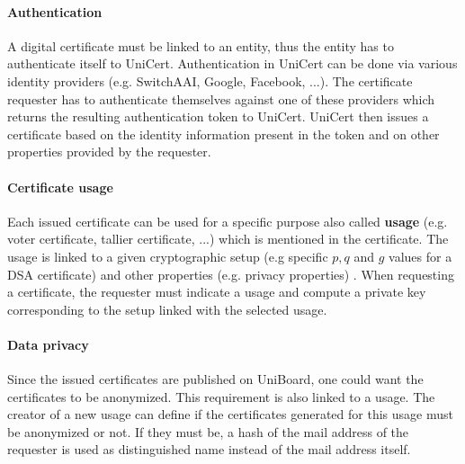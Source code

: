 \documentclass[bibtotoc,halfparskip,oneside]{scrreprt}
\begin{document}
\paragraph*{Authentication} A digital certificate must be linked to an entity, thus the entity has to authenticate itself to UniCert. Authentication in UniCert can be done via various identity providers (e.g. SwitchAAI, Google, Facebook, ...). The certificate requester has to authenticate themselves against one of these providers which returns the resulting authentication token to UniCert. 
UniCert then issues a certificate based on the identity information present in the token and on other properties provided by the requester.


\paragraph*{Certificate usage} Each issued certificate can be used for a specific purpose also called \textbf{usage} (e.g. voter certificate, tallier certificate, ...) which is mentioned in the certificate. The usage is linked to a given cryptographic setup (e.g specific $p,q$ and $g$ values for a DSA certificate) and other properties (e.g. privacy properties) . When requesting a certificate, the requester must indicate a usage and compute a private key corresponding to the setup linked with the selected usage. 

\paragraph*{Data privacy} Since the issued certificates are published on UniBoard, one could want the certificates to be anonymized. This requirement is also linked to a usage. The creator of a new usage can define if the certificates generated for this usage must be anonymized or not. If they must be, a hash of the mail address of the requester is used as distinguished name instead of the mail address itself.
\end{document}

